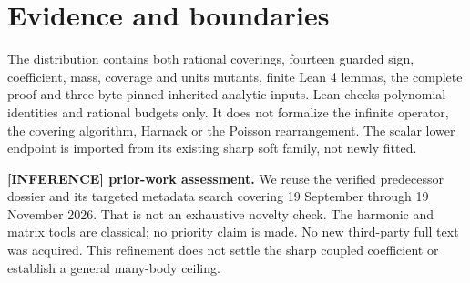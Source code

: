 \documentclass[11pt]{article}
\begin{document}
\section{Evidence and boundaries}
The distribution contains both rational coverings, fourteen guarded sign, coefficient, mass, coverage and units mutants, finite Lean 4 lemmas, the complete proof and three byte-pinned inherited analytic inputs. Lean checks polynomial identities and rational budgets only. It does not formalize the infinite operator, the covering algorithm, Harnack or the Poisson rearrangement. The scalar lower endpoint is imported from its existing sharp soft family, not newly fitted.

\textbf{[INFERENCE] prior-work assessment.} We reuse the verified predecessor dossier and its targeted metadata search covering 19 September through 19 November 2026. That is not an exhaustive novelty check. The harmonic and matrix tools are classical; no priority claim is made. No new third-party full text was acquired. This refinement does not settle the sharp coupled coefficient or establish a general many-body ceiling.


\end{document}
